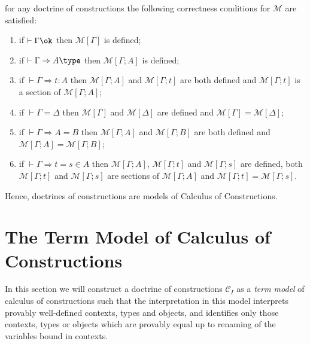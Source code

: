 \begin{theorem}
    for any doctrine of constructions the following correctness conditions for $\mathcal{M}$ are satisfied:
    \begin{enumerate}
        \item if $\vdash \Gamma \ok$ then $\mathcal{M}[\Gamma]$ is defined;
        \item if $\vdash \Gamma \Rightarrow A \type$ then $\mathcal{M}[\Gamma; A]$ is defined;
        \item if $\vdash \Gamma \Rightarrow t \colon A$ then $\mathcal{M}[\Gamma; A]$ and $\mathcal{M}[\Gamma; t]$
              are both defined and $\mathcal{M}[\Gamma; t]$ is a section of $\mathcal{M}[\Gamma; A]$;
        \item if $\vdash \Gamma = \Delta$ then $\mathcal{M}[\Gamma]$ and $\mathcal{M}[\Delta]$ are defined 
              and $\mathcal{M}[\Gamma] = \mathcal{M}[\Delta]$;
        \item if $\vdash \Gamma \Rightarrow A = B$ then $\mathcal{M}[\Gamma; A]$ and $\mathcal{M}[\Gamma; B]$
              are both defined and $\mathcal{M}[\Gamma; A] = \mathcal{M}[\Gamma; B]$;
        \item if $\vdash \Gamma \Rightarrow t = s \in A$ then $\mathcal{M}[\Gamma; A]$, $\mathcal{M}[\Gamma; t]$
              and $\mathcal{M}[\Gamma; s]$ are defined, both $\mathcal{M}[\Gamma; t]$ and $\mathcal{M}[\Gamma; s]$
              are sections of $\mathcal{M}[\Gamma; A]$ and $\mathcal{M}[\Gamma; t] = \mathcal{M}[\Gamma; s]$.
    \end{enumerate}
\end{theorem}

Hence, doctrines of constructions are models of Calculus of Constructions.

\section{The Term Model of Calculus of Constructions}

In this section we will construct a doctrine of constructions $\mathcal{C}_I$ as a \textit{term model}
of calculus of constructions such that the interpretation in this model interprets provably well-defined
contexts, types and objects, and identifies only those contexts, types or objects which are provably equal
up to renaming of the variables bound in contexts.

